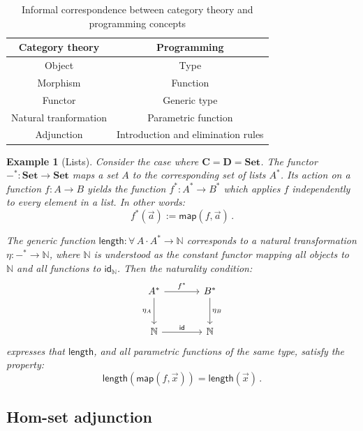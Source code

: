 \documentclass[11pt,oneside,draft]{book}
\newtheorem{example}[theorem]{Example}
\theoremstyle{definition}
\newcommand{\kw}[1]{\ensuremath{ \mathsf{#1} }}
\newcommand{\bdot}{\boldsymbol{\cdot}}
\begin{document}
\begin{table} %
  \centering
  \begin{tabular}{cc}
    \hline
    Category theory & Programming \\
    \hline
    Object & Type \\
    Morphism & Function \\
    Functor & Generic type \\
    Natural tranformation & Parametric function \\
    Adjunction & Introduction and elimination rules \\
    \hline
  \end{tabular}
  \caption{Informal correspondence between category theory and
    programming concepts}
  \label{tbl:catpl}
\end{table}

\begin{example}[Lists]
Consider the case where
$\mathbf{C} = \mathbf{D} = \mathbf{Set}$.
The functor ${-}^* : \mathbf{Set} \rightarrow \mathbf{Set}$
maps a set $A$ to the corresponding set of lists $A^*$.
Its action on a function  $f : A \rightarrow B$
yields the function $f^* : A^* \rightarrow B^*$
which applies $f$ independently to every element in a list.
In other words:
\[
  f^*(\vec{a}) := \kw{map}(f, \vec{a})
  \,.
\]

The generic function
$
  \kw{length} : \forall \, A \, \bdot \, A^* \rightarrow \mathbb{N}
$
corresponds to a natural transformation
$\eta : -^* \rightarrow \mathbb{N}$,
where $\mathbb{N}$ is understood as the constant functor
mapping all objects to $\mathbb{N}$ and all functions to $\kw{id}_\mathbb{N}$.
Then the naturality condition:
\[
  \begin{tikzcd}[sep=large]
    A^* \ar[r, "f^*"] \ar[d, "\eta_A"'] & B^* \ar[d, "\eta_B"] \\
    \mathbb{N} \ar[r, "\kw{id}"] & \mathbb{N}
  \end{tikzcd}
\]
expresses that \kw{length},
and all parametric functions of the same type,
satisfy the property:
\[
  \kw{length}(\kw{map}(f, \vec{x})) = \kw{length}(\vec{x})
  \,.
\]
\end{example}


\subsection{Hom-set adjunction} %
\end{document}
